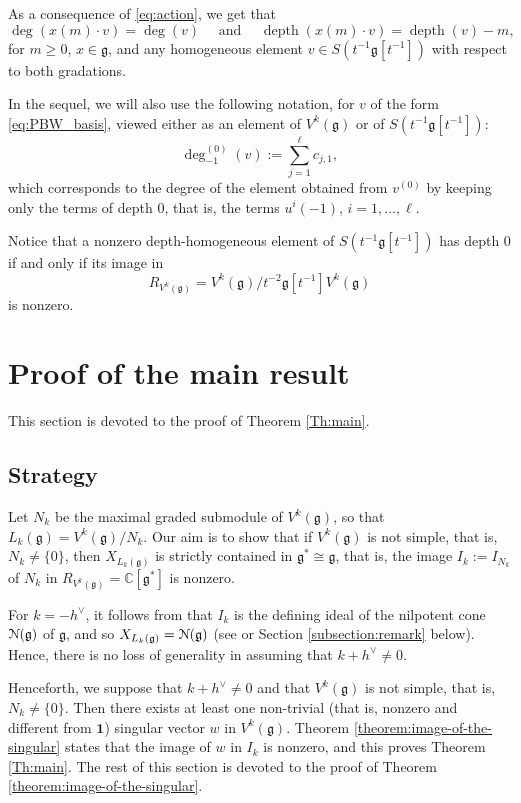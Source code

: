 \documentclass[11pt]{article}
\numberwithin{equation}{section}
\let\oldvee\vee
\renewcommand{\vee}{{\scriptscriptstyle\oldvee}}
\let\mathcal \EuScript
\newcommand\C{{\mathbb C}}
\DeclareMathOperator{\dep}{depth}
\newcommand \g{\mathfrak g}
\theoremstyle{definition}
\begin{document}
As a consequence of \eqref{eq:action}, we get that
\begin{equation}
\label{eq:homogeneous}
\deg(x(m)\cdot v) = \deg(v) \quad \text{ and }
\quad \dep(x(m)\cdot v)= \dep(v) - m,
\end{equation}
for
$m\geq 0$, $x\in\g$, and any homogeneous element $v \in S(t^{-1}\g[t^{-1}])$
with respect to both gradations.

In the sequel, we will also
use the following notation, for $v$ of the form \eqref{eq:PBW_basis},
viewed either as an element of $V^k(\g)$ or of $S(t^{-1}\g[t^{-1}])$:
\begin{equation}
\label{eq:deg_-1}
\deg_{-1}^{(0)}(v) :=
\sum_{j=1}^\ell c_{j,1 },
\end{equation}
which corresponds to the degree of the element
obtained from $v^{(0)}$ by keeping only the terms of
depth $0$, that is, the terms $u^{i}(-1)$, $i=1,\dots,\ell$.

Notice that a nonzero depth-homogeneous
element of $S(t^{-1}\g[t^{-1}])$ has depth $0$ if
and only if
its image in
\[
R_{V^k(\g)} = V^k(\g)/t^{-2} \g[t^{-1}] V^k(\g)
\]
is nonzero.
\section{Proof of the main result}
\label{sec:main_proof}

This section is devoted to the proof of Theorem \ref{Th:main}.

\subsection{Strategy}
{Let $N_k$ be the maximal graded submodule of $V^k(\g)$,
so that $L_k(\g)=V^k(\g)/N_k$.
Our aim is to show that if $V^k(\g)$ is not simple, that is,
$N_k\not=\{0\}$, then $X_{L_k(\g)}$
is strictly contained in $\g^*\cong\g$, that is,
the image $I_k:=I_{N_k}$ of $N_k$ in
$R_{V^k(\g)}=\C[\g^*]$ is nonzero.}

For $k=-h^\vee$, it follows from \cite{FreGai04} that
$I_k$ is the defining ideal of the
nilpotent
cone $ \mathcal{N}(\g)$ of $\g$,
and so
$X_{L_k(\g)} = \mathcal{N}(\g)$ (see \cite{A11} or Section \ref{subsection:remark}
below).
Hence, there is no loss of generality in assuming that $k+h^\vee \not=0$.

Henceforth, we suppose that $k+h^\vee \not=0$ and
that $V^k(\g)$ is not simple,
that is,
$N_k\ne \{0\}$.
Then there exists at least
one non-trivial (that is, nonzero and different from
$\mathbf{1}$) singular vector $w$
in $V^k(\g)$.
Theorem \ref{theorem:image-of-the-singular}
states that
the image of $w$ in $I_k$ is nonzero,
and
this proves
Theorem \ref{Th:main}. The rest of this section is devoted
to the proof of Theorem \ref{theorem:image-of-the-singular}.
\end{document}
